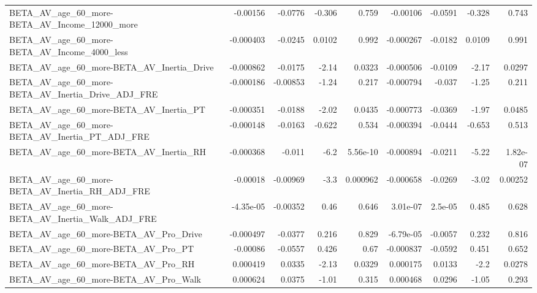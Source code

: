 \begin{tabular}{lrrrrrrrr}
BETA\_AV\_age\_60\_more-BETA\_AV\_Income\_12000\_more      &    -0.00156 &      -0.0776 &   -0.306 &    0.759 &   -0.00106 &     -0.0591 &       -0.328 &         0.743 \\
BETA\_AV\_age\_60\_more-BETA\_AV\_Income\_4000\_less       &   -0.000403 &      -0.0245 &   0.0102 &    0.992 &  -0.000267 &     -0.0182 &       0.0109 &         0.991 \\
BETA\_AV\_age\_60\_more-BETA\_AV\_Inertia\_Drive          &   -0.000862 &      -0.0175 &    -2.14 &   0.0323 &  -0.000506 &     -0.0109 &        -2.17 &        0.0297 \\
BETA\_AV\_age\_60\_more-BETA\_AV\_Inertia\_Drive\_ADJ\_FRE  &   -0.000186 &     -0.00853 &    -1.24 &    0.217 &  -0.000794 &      -0.037 &        -1.25 &         0.211 \\
BETA\_AV\_age\_60\_more-BETA\_AV\_Inertia\_PT             &   -0.000351 &      -0.0188 &    -2.02 &   0.0435 &  -0.000773 &     -0.0369 &        -1.97 &        0.0485 \\
BETA\_AV\_age\_60\_more-BETA\_AV\_Inertia\_PT\_ADJ\_FRE     &   -0.000148 &      -0.0163 &   -0.622 &    0.534 &  -0.000394 &     -0.0444 &       -0.653 &         0.513 \\
BETA\_AV\_age\_60\_more-BETA\_AV\_Inertia\_RH             &   -0.000368 &       -0.011 &     -6.2 & 5.56e-10 &  -0.000894 &     -0.0211 &        -5.22 &      1.82e-07 \\
BETA\_AV\_age\_60\_more-BETA\_AV\_Inertia\_RH\_ADJ\_FRE     &    -0.00018 &     -0.00969 &     -3.3 & 0.000962 &  -0.000658 &     -0.0269 &        -3.02 &       0.00252 \\
BETA\_AV\_age\_60\_more-BETA\_AV\_Inertia\_Walk\_ADJ\_FRE   &   -4.35e-05 &     -0.00352 &     0.46 &    0.646 &   3.01e-07 &     2.5e-05 &        0.485 &         0.628 \\
BETA\_AV\_age\_60\_more-BETA\_AV\_Pro\_Drive              &   -0.000497 &      -0.0377 &    0.216 &    0.829 &  -6.79e-05 &     -0.0057 &        0.232 &         0.816 \\
BETA\_AV\_age\_60\_more-BETA\_AV\_Pro\_PT                 &    -0.00086 &      -0.0557 &    0.426 &     0.67 &  -0.000837 &     -0.0592 &        0.451 &         0.652 \\
BETA\_AV\_age\_60\_more-BETA\_AV\_Pro\_RH                 &    0.000419 &       0.0335 &    -2.13 &   0.0329 &   0.000175 &      0.0133 &         -2.2 &        0.0278 \\
BETA\_AV\_age\_60\_more-BETA\_AV\_Pro\_Walk               &    0.000624 &       0.0375 &    -1.01 &    0.315 &   0.000468 &      0.0296 &        -1.05 &         0.293 \\

\end{tabular}
